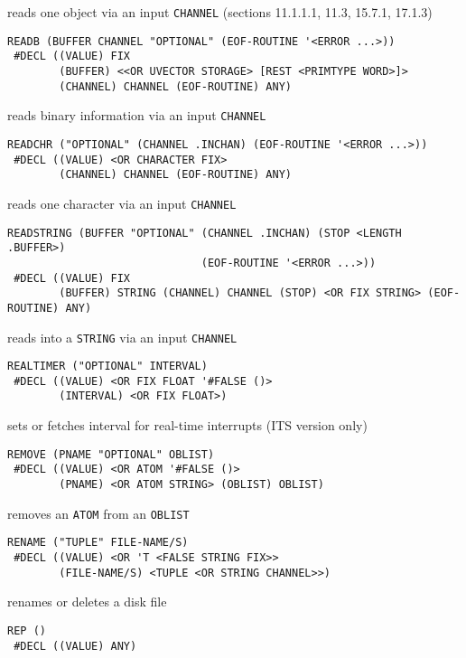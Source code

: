 \documentclass[a4paper]{scrbook}
\begin{document}
reads one object via an input \texttt{CHANNEL} (sections 11.1.1.1, 11.3, 15.7.1, 17.1.3)

\begin{verbatim}
READB (BUFFER CHANNEL "OPTIONAL" (EOF-ROUTINE '<ERROR ...>))
 #DECL ((VALUE) FIX
        (BUFFER) <<OR UVECTOR STORAGE> [REST <PRIMTYPE WORD>]>
        (CHANNEL) CHANNEL (EOF-ROUTINE) ANY)
\end{verbatim}

reads binary information via an input \texttt{CHANNEL}

\begin{verbatim}
READCHR ("OPTIONAL" (CHANNEL .INCHAN) (EOF-ROUTINE '<ERROR ...>))
 #DECL ((VALUE) <OR CHARACTER FIX>
        (CHANNEL) CHANNEL (EOF-ROUTINE) ANY)
\end{verbatim}

reads one character via an input \texttt{CHANNEL}

\begin{verbatim}
READSTRING (BUFFER "OPTIONAL" (CHANNEL .INCHAN) (STOP <LENGTH .BUFFER>)
                              (EOF-ROUTINE '<ERROR ...>))
 #DECL ((VALUE) FIX
        (BUFFER) STRING (CHANNEL) CHANNEL (STOP) <OR FIX STRING> (EOF-ROUTINE) ANY)
\end{verbatim}

reads into a \texttt{STRING} via an input \texttt{CHANNEL}

\begin{verbatim}
REALTIMER ("OPTIONAL" INTERVAL)
 #DECL ((VALUE) <OR FIX FLOAT '#FALSE ()>
        (INTERVAL) <OR FIX FLOAT>)
\end{verbatim}

sets or fetches interval for real-time interrupts (ITS version only)

\begin{verbatim}
REMOVE (PNAME "OPTIONAL" OBLIST)
 #DECL ((VALUE) <OR ATOM '#FALSE ()>
        (PNAME) <OR ATOM STRING> (OBLIST) OBLIST)
\end{verbatim}

removes an \texttt{ATOM} from an \texttt{OBLIST}

\begin{verbatim}
RENAME ("TUPLE" FILE-NAME/S)
 #DECL ((VALUE) <OR 'T <FALSE STRING FIX>>
        (FILE-NAME/S) <TUPLE <OR STRING CHANNEL>>)
\end{verbatim}

renames or deletes a disk file

\begin{verbatim}
REP ()
 #DECL ((VALUE) ANY)
\end{verbatim}
\end{document}
